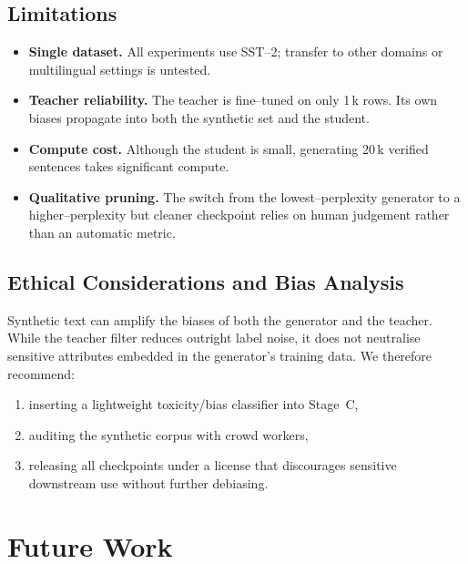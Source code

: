 \documentclass[11pt]{article}
\begin{document}
\subsection{Limitations}
\begin{itemize}
  \item \textbf{Single dataset.}  All experiments use SST--2; transfer to
    other domains or multilingual settings is untested.
  \item \textbf{Teacher reliability.}  The teacher is fine--tuned on only
    1\,k rows.  Its own biases propagate into both the synthetic set
    and the student.
  \item \textbf{Compute cost.}  Although the student is small, generating
    20\,k verified sentences takes significant compute.
  \item \textbf{Qualitative pruning.}  The switch from the
    lowest--perplexity
    generator to a higher--perplexity but cleaner checkpoint relies
    on human judgement rather than an automatic metric.
\end{itemize}

\subsection{Ethical Considerations and Bias Analysis}
Synthetic text can amplify the biases of both the generator and the
teacher.  While the
teacher filter reduces outright label noise, it does not neutralise
sensitive attributes embedded in the generator's training data.
We therefore recommend:

\begin{enumerate}
  \item inserting a lightweight toxicity/bias classifier into
    Stage~C,
  \item auditing the synthetic corpus with crowd workers,
  \item releasing all checkpoints under a license that discourages
    sensitive downstream use without further debiasing.
\end{enumerate}

\vspace{1em}
\section{Future Work}
\label{sec:future}
\end{document}
